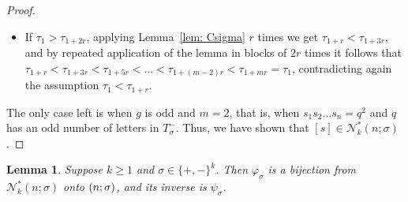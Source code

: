 \documentclass[12pt]{article}
\let\SS\relax
\DeclareMathOperator{\SS}{Seg}
\newcommand{\N}{\mathcal{N}}
\theoremstyle{plain}
\newtheorem{lemma}[theorem]{Lemma}
\theoremstyle{definition}
\begin{document}
\begin{proof}
\begin{itemize}
\item If $\tau_{1}>\tau_{1+2r}$, applying Lemma~\ref{lem: Csigma} $r$ times we get $\tau_{1+r}<\tau_{1+3r}$, and by repeated application of the lemma in blocks of $2r$ times it follows that
$\tau_{1+r}<\tau_{1+3r}<\tau_{1+5r}<\dots< \tau_{1+(m-2)r}<\tau_{1+mr}=\tau_1$, contradicting again the assumption $\tau_1<\tau_{1+r}$.
\end{itemize}

The only case left is when $g$ is odd and $m = 2$, that is, when $s_1s_2\dots s_n = q^2$ and $q$ has an odd number of letters in $T^-_\sigma$. Thus, we have shown that $[s]\in \N^*_k(n;\sigma)$.
\end{proof}

\begin{lemma}\label{lem: inverses}
Suppose $k\geq 1$ and $\sigma \in \{+,-\}^k$.  Then $\varphi_\sigma$ is a bijection from $\N^*_k(n;\sigma)$ onto $\SS(n;\sigma)$, and its inverse is $\psi_\sigma$. 
\end{lemma}
\end{document}

